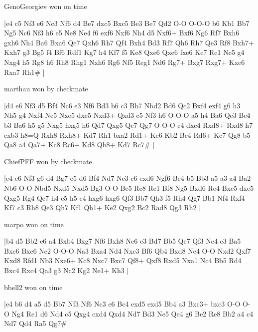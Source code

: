 \showboard

GenoGeorgiev won on time

\makegametitle
|e4 c5 Nf3 e6 Nc3 Nf6 d4 Be7 dxc5 Bxc5 Be3 Be7 Qd2 O-O O-O-O b6 Kb1 Bb7 Ng5 Nc6 Nf3 h6 e5 Ne8 Ne4 f6 exf6 Nxf6 Nh4 d5 Nxf6+ Bxf6 Ng6 Rf7 Bxh6 gxh6 Nh4 Ba6 Bxa6 Qe7 Qxh6 Rh7 Qf4 Bxh4 Bd3 Rf7 Qh6 Rh7 Qe3 Rf8 Bxh7+ Kxh7 g3 Bg5 f4 Bf6 Rdf1 Kg7 h4 Kf7 f5 Ke8 Qxe6 Qxe6 fxe6 Ke7 Re1 Ne5 g4 Nxg4 h5 Rg8 h6 Rh8 Rhg1 Nxh6 Rg6 Nf5 Reg1 Nd6 Rg7+ Bxg7 Rxg7+ Kxe6 Rxa7 Rh1\#  |

\showboard

marthau won by checkmate

\makegametitle
|d4 e6 Nf3 d5 Bf4 Nc6 e3 Nf6 Bd3 b6 c3 Bb7 Nbd2 Bd6 Qc2 Bxf4 exf4 g6 h3 Nh5 g4 Nxf4 Ne5 Nxe5 dxe5 Nxd3+ Qxd3 c5 Nf3 h6 O-O-O a5 h4 Ba6 Qe3 Bc4 b3 Ba6 h5 g5 Nxg5 hxg5 h6 Qd7 Qxg5 Qe7 Qg7 O-O-O c4 dxc4 Rxd8+ Rxd8 h7 cxb3 h8=Q Rxh8 Rxh8+ Kd7 Rh1 bxa2 Rd1+ Kc6 Kb2 Bc4 Rd6+ Kc7 Qg8 b5 Qa8 a4 Qa7+ Kc8 Rc6+ Kd8 Qb8+ Kd7 Rc7\#  |

\showboard

ChiefPFF won by checkmate

\makegametitle
|e4 e6 Nf3 g6 d4 Bg7 e5 d6 Bf4 Nd7 Nc3 c6 exd6 Ngf6 Bc4 b5 Bb3 a5 a3 a4 Ba2 Nb6 O-O Nbd5 Nxd5 Nxd5 Bg3 O-O Be5 Re8 Re1 Bf8 Ng5 Bxd6 Re4 Bxe5 dxe5 Qxg5 Rg4 Qe7 h4 c5 h5 c4 hxg6 hxg6 Qf3 Bb7 Qh3 f5 Rh4 Qg7 Bb1 Nf4 Rxf4 Kf7 c3 Rh8 Qe3 Qh7 Kf1 Qh1+ Ke2 Qxg2 Bc2 Rad8 Qg3 Rh2  |

\showboard

marpo won on time

\makegametitle
|b4 d5 Bb2 e6 a4 Bxb4 Bxg7 Nf6 Bxh8 Nc6 e3 Bd7 Bb5 Qe7 Qf3 Ne4 c3 Ba5 Bxc6 Bxc6 Ne2 O-O-O Na3 Bxa4 Nd4 Nxc3 Bf6 Qb4 Bxd8 Ne4 O-O Nxd2 Qxf7 Kxd8 Rfd1 Nb3 Nxe6+ Kc8 Nxc7 Bxc7 Qf8+ Qxf8 Rxd5 Nxa1 Nc4 Bb5 Rd4 Bxc4 Rxc4 Qa3 g3 Nc2 Kg2 Ne1+ Kh3  |

\showboard

bbell2 won on time

\makegametitle
|e4 b6 d4 a5 d5 Bb7 Nf3 Nf6 Nc3 e6 Bc4 exd5 exd5 Bb4 a3 Bxc3+ bxc3 O-O O-O Ng4 Re1 d6 Nd4 c5 Qxg4 cxd4 Qxd4 Nd7 Bd3 Ne5 Qe4 g6 Be2 Re8 Bb2 a4 c4 Nd7 Qd4 Ra5 Qg7\#  |

